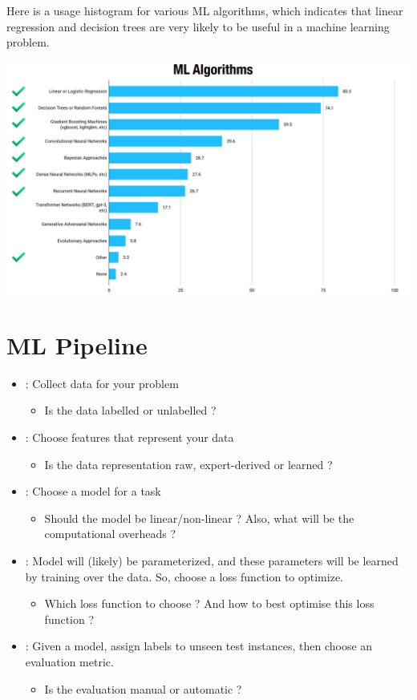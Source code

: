 Here is a usage histogram for various ML algorithms, which indicates that linear regression and decision trees are very likely to be useful in a machine learning problem.

\begin{center}
  \includegraphics[scale=0.2]{"images/02.png"}
\end{center}

\section{ML Pipeline}
\begin{itemize}
  \item {}: Collect data for your problem
        \begin{itemize}
          \item Is the data labelled or unlabelled ?
        \end{itemize}
  \item {}: Choose features that represent your data
        \begin{itemize}
          \item Is the data representation raw, expert-derived or learned ?
        \end{itemize}
  \item {}: Choose a model for a task
        \begin{itemize}
          \item Should the model be linear/non-linear ? Also, what will be the computational overheads ?
        \end{itemize}
  \item {}: Model will (likely) be parameterized, and these parameters will be learned by training over the data. So, choose a loss function to optimize.
        \begin{itemize}
          \item Which loss function to choose ? And how to best optimise this loss function ?
        \end{itemize}
  \item {}: Given a model, assign labels to unseen test instances, then choose an evaluation metric.
        \begin{itemize}
          \item Is the evaluation manual or automatic ?
        \end{itemize}
\end{itemize}

